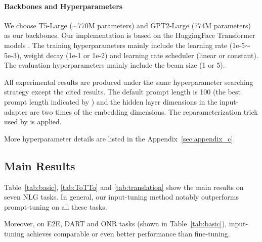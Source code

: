 \paragraph{Backbones and Hyperparameters}

We choose T5-Large ($\sim$770M parameters) and GPT2-Large (774M parameters) as our backbones. Our implementation is based on the HuggingFace Transformer models \cite{wolf2020transformers}. The training hyperparameters mainly include the learning rate (1e-5$\sim$5e-3), weight decay (1e-1 or 1e-2) and learning rate scheduler (linear or constant). The evaluation hyperparameters mainly include the beam size (1 or 5).

All experimental results are produced under the same hyperparameter searching strategy except the cited results. The default prompt length is 100 (the best prompt length indicated by \citet{lester2021power}) and the hidden layer dimensions in the input-adapter are two times of the embedding dimensions. The reparameterization trick used by \citet{li2021prefix} is applied.

More hyperparameter details are listed in the Appendix~\ref{sec:appendix_c}.

\subsection{Main Results}

Table~\ref{tab:basic}, \ref{tab:ToTTo} and \ref{tab:translation} show the main results on seven NLG tasks. In general, our input-tuning method notably outperforms prompt-tuning on all these tasks. 

Moreover, on E2E, DART and ONR tasks (shown in Table~\ref{tab:basic}), input-tuning achieves comparable or even better performance than fine-tuning.

